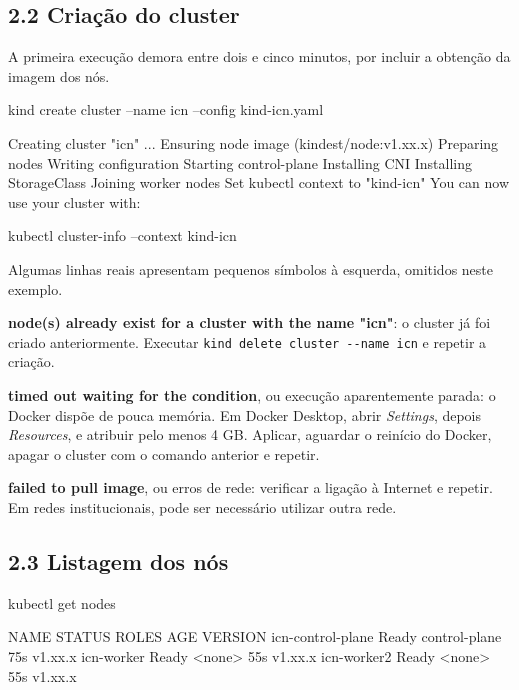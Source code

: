 \documentclass[11pt,a4paper]{article}
\newcommand{\cmd}[1]{\texttt{#1}}
\begin{document}
\subsection*{2.2 Criação do cluster}

A primeira execução demora entre dois e cinco minutos, por incluir a obtenção da imagem dos nós.

\begin{terminal}
kind create cluster --name icn --config kind-icn.yaml
\end{terminal}

\begin{saida}
Creating cluster "icn" ...
 Ensuring node image (kindest/node:v1.xx.x)
 Preparing nodes
 Writing configuration
 Starting control-plane
 Installing CNI
 Installing StorageClass
 Joining worker nodes
Set kubectl context to "kind-icn"
You can now use your cluster with:

kubectl cluster-info --context kind-icn
\end{saida}

Algumas linhas reais apresentam pequenos símbolos à esquerda, omitidos neste exemplo.

\begin{erro}
\textbf{node(s) already exist for a cluster with the name "icn"}: o cluster já foi criado anteriormente. Executar \cmd{kind delete cluster -{}-name icn} e repetir a criação.

\textbf{timed out waiting for the condition}, ou execução aparentemente parada: o Docker dispõe de pouca memória. Em Docker Desktop, abrir \emph{Settings}, depois \emph{Resources}, e atribuir pelo menos 4 GB. Aplicar, aguardar o reinício do Docker, apagar o cluster com o comando anterior e repetir.

\textbf{failed to pull image}, ou erros de rede: verificar a ligação à Internet e repetir. Em redes institucionais, pode ser necessário utilizar outra rede.
\end{erro}

\subsection*{2.3 Listagem dos nós}

\begin{terminal}
kubectl get nodes
\end{terminal}

\begin{saida}
NAME                  STATUS   ROLES           AGE   VERSION
icn-control-plane     Ready    control-plane   75s   v1.xx.x
icn-worker            Ready    <none>          55s   v1.xx.x
icn-worker2           Ready    <none>          55s   v1.xx.x
\end{saida}
\end{document}

